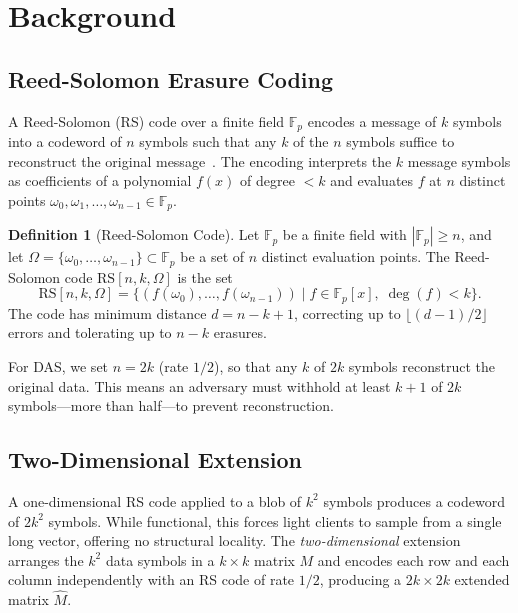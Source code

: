 \documentclass[11pt,a4paper]{article}
\theoremstyle{plain}
\theoremstyle{definition}
\newtheorem{definition}{Definition}[section]
\theoremstyle{remark}
\begin{document}
\section{Background}
\label{sec:background}

\subsection{Reed-Solomon Erasure Coding}

A Reed-Solomon (RS) code over a finite field $\mathbb{F}_p$ encodes a message of $k$ symbols
into a codeword of $n$ symbols such that any $k$ of the $n$ symbols suffice to reconstruct the
original message~\cite{reed1960polynomial}. The encoding interprets the $k$ message symbols
as coefficients of a polynomial $f(x)$ of degree $< k$ and evaluates $f$ at $n$ distinct
points $\omega_0, \omega_1, \ldots, \omega_{n-1} \in \mathbb{F}_p$.

\begin{definition}[Reed-Solomon Code]
Let $\mathbb{F}_p$ be a finite field with $|\mathbb{F}_p| \geq n$, and let
$\Omega = \{\omega_0, \ldots, \omega_{n-1}\} \subset \mathbb{F}_p$ be a set of $n$ distinct
evaluation points. The Reed-Solomon code $\text{RS}[n, k, \Omega]$ is the set
\[
    \text{RS}[n,k,\Omega] = \{(f(\omega_0), \ldots, f(\omega_{n-1})) \mid f \in \mathbb{F}_p[x],\; \deg(f) < k\}.
\]
The code has minimum distance $d = n - k + 1$, correcting up to $\lfloor(d-1)/2\rfloor$ errors
and tolerating up to $n - k$ erasures.
\end{definition}

For DAS, we set $n = 2k$ (rate $1/2$), so that any $k$ of $2k$ symbols reconstruct the
original data. This means an adversary must withhold at least $k + 1$ of $2k$ symbols---more
than half---to prevent reconstruction.

\subsection{Two-Dimensional Extension}

A one-dimensional RS code applied to a blob of $k^2$ symbols produces a codeword of $2k^2$
symbols. While functional, this forces light clients to sample from a single long vector,
offering no structural locality. The \emph{two-dimensional} extension arranges the $k^2$ data
symbols in a $k \times k$ matrix $M$ and encodes each row and each column independently with
an RS code of rate $1/2$, producing a $2k \times 2k$ extended matrix $\hat{M}$.
\end{document}

